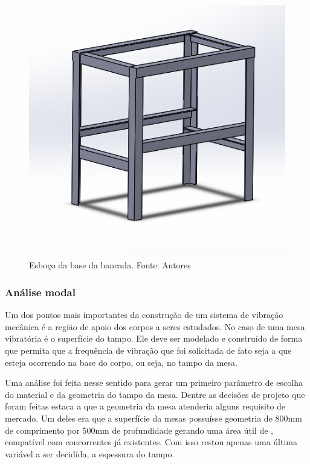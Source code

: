 \begin{figure}[!ht]
\centering
\includegraphics[scale=0.5]{figuras/base_bancada.png}
\caption{Esboço da base da bancada. Fonte: Autores}
\label{fig:base_bancada}
\end{figure}

\subsubsection*{\textbf{Análise modal}}	

Um dos pontos mais importantes da construção de um sistema de vibração mecânica é a região de apoio dos corpos a seres estudados. No caso de uma mesa vibratória é o superfície do tampo. Ele deve ser modelado e construído de forma que permita que a frequência de vibração que foi solicitada de fato seja a que esteja ocorrendo na base do corpo, ou seja, no tampo da mesa.

	Uma análise foi feita nesse sentido para gerar um primeiro parâmetro de escolha do material e da geometria do tampo da mesa. Dentre as decisões de projeto que foram feitas estaca a que a geometria da mesa atenderia alguns requisito de mercado. Um deles era que a superfície da mesas possuísse geometria de 800mm de comprimento por 500mm de profundidade gerando uma área útil de , compatível com concorrentes já existentes. Com isso restou apenas uma última variável a ser decidida, a espessura do tampo.
    
